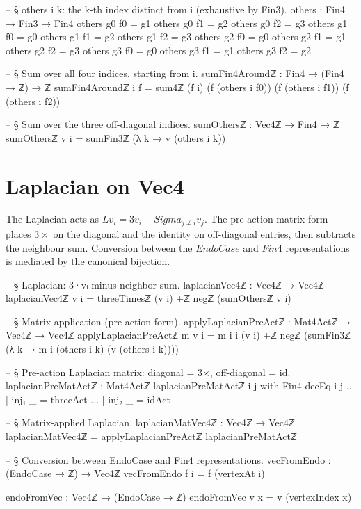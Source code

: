 \documentclass[11pt,a4paper]{book}
\def\Sigma{Sigma}%
\def\mathrm#1{#1}%
\begin{document}
\begin{code}
-- § others i k: the k-th index distinct from i (exhaustive by Fin3).
others : Fin4 → Fin3 → Fin4
others g0 f0 = g1
others g0 f1 = g2
others g0 f2 = g3
others g1 f0 = g0
others g1 f1 = g2
others g1 f2 = g3
others g2 f0 = g0
others g2 f1 = g1
others g2 f2 = g3
others g3 f0 = g0
others g3 f1 = g1
others g3 f2 = g2

-- § Sum over all four indices, starting from i.
sumFin4Aroundℤ : Fin4 → (Fin4 → ℤ) → ℤ
sumFin4Aroundℤ i f = sum4ℤ (f i) (f (others i f0)) (f (others i f1)) (f (others i f2))

-- § Sum over the three off-diagonal indices.
sumOthersℤ : Vec4ℤ → Fin4 → ℤ
sumOthersℤ v i = sumFin3ℤ (λ k → v (others i k))
\end{code}

\section{Laplacian on Vec4}

The Laplacian acts as $Lv_i = 3 v_i - \Sigma_{j \neq i} v_j$.
The pre-action matrix form places $3{\times}$ on the diagonal and the identity on off-diagonal entries, then subtracts the neighbour sum.
Conversion between the $\mathrm{EndoCase}$ and $\mathrm{Fin4}$ representations is mediated by the canonical bijection.

\begin{code}
-- § Laplacian: 3·vᵢ minus neighbor sum.
laplacianVec4ℤ : Vec4ℤ → Vec4ℤ
laplacianVec4ℤ v i = threeTimesℤ (v i) +ℤ negℤ (sumOthersℤ v i)

-- § Matrix application (pre-action form).
applyLaplacianPreActℤ : Mat4Actℤ → Vec4ℤ → Vec4ℤ
applyLaplacianPreActℤ m v i =
  m i i (v i) +ℤ
  negℤ (sumFin3ℤ (λ k → m i (others i k) (v (others i k))))

-- § Pre-action Laplacian matrix: diagonal = 3×, off-diagonal = id.
laplacianPreMatActℤ : Mat4Actℤ
laplacianPreMatActℤ i j with Fin4-decEq i j
... | inj₁ _ = threeAct
... | inj₂ _ = idAct

-- § Matrix-applied Laplacian.
laplacianMatVec4ℤ : Vec4ℤ → Vec4ℤ
laplacianMatVec4ℤ = applyLaplacianPreActℤ laplacianPreMatActℤ

-- § Conversion between EndoCase and Fin4 representations.
vecFromEndo : (EndoCase → ℤ) → Vec4ℤ
vecFromEndo f i = f (vertexAt i)

endoFromVec : Vec4ℤ → (EndoCase → ℤ)
endoFromVec v x = v (vertexIndex x)
\end{code}
\end{document}
